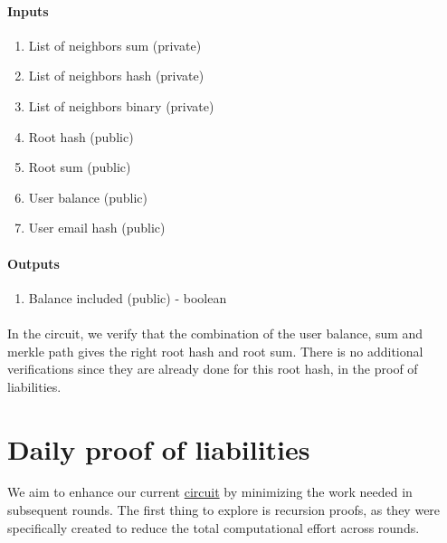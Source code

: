 \paragraph{Inputs}
\begin{enumerate}


   \item List of neighbors sum (private)
  
   \item List of neighbors hash (private)


   \item List of neighbors binary (private)


   \item Root hash (public)


   \item Root sum (public)


   \item User balance (public)


   \item User email hash (public)
  
   \end{enumerate}


\paragraph{Outputs}
\begin{enumerate}
   \item Balance included (public) - boolean
   \end{enumerate}


\paragraph{}
In the circuit, we verify that the combination of the user balance, sum and merkle path gives the right root hash and root sum. There is no additional
verifications since they are already done for this root hash, in the proof of liabilities.




\section{Daily proof of liabilities}
We aim to enhance our current \hyperref[subsec:pl]{circuit} by minimizing the work needed in subsequent rounds.
The first thing to explore is recursion proofs, as they were specifically created to reduce the total computational effort across rounds.




